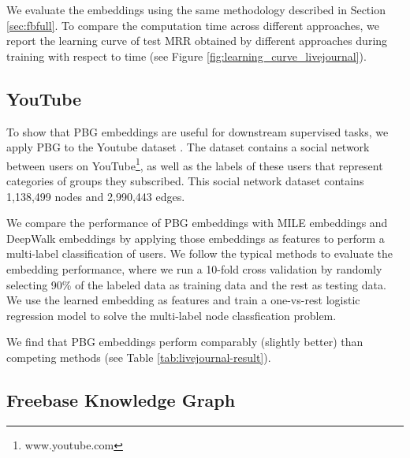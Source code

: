 \documentclass{article}
\begin{document}
We evaluate the embeddings using the same methodology described in Section \ref{sec:fbfull}. To compare the computation time across different approaches, we report the learning curve of test MRR obtained by different approaches during training with respect to time (see Figure \ref{fig:learning_curve_livejournal}).

\subsection{YouTube}
To show that PBG embeddings are useful for downstream supervised tasks, we apply PBG to the Youtube dataset \cite{tang2009scalable}. The dataset contains a social network between users on YouTube\footnote{www.youtube.com}, as well as the labels of these users that represent categories of groups they subscribed. This social network dataset contains 1,138,499 nodes and 2,990,443 edges. 

We compare the performance of PBG embeddings with MILE embeddings and DeepWalk embeddings by applying those embeddings as features to perform a multi-label classification of users. We follow the typical methods \cite{deepwalk14, liang2018mile} to evaluate the embedding performance, where we run a 10-fold cross validation by randomly selecting 90\% of the labeled data as training data and the rest as testing data. We use the learned embedding as features and train a one-vs-rest logistic regression model to solve the multi-label node classfication problem. 

We find that PBG embeddings perform comparably (slightly better) than competing methods (see Table \ref{tab:livejournal-result}).













\subsection{Freebase Knowledge Graph}
\end{document}

